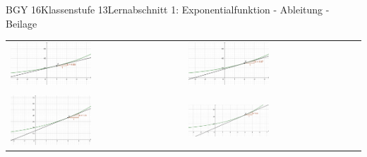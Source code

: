 \documentclass[oneside,openany,headings=optiontotoc,11pt,numbers=noenddot]{scrreprt}
\begin{document}
\begin{worksheet}{BGY 16}{Klassenstufe 13}{Lernabschnitt 1: Exponentialfunktion - Ableitung - Beilage}
\begin{framed}
\begin{tabularx}{\textwidth}{X|X}
				\includegraphics[width=0.48\textwidth]{../99_Bilder/01_ExpFkt/AbleFkt/1O.png} & \includegraphics[width=0.48\textwidth]{../99_Bilder/01_ExpFkt/AbleFkt/2O.png}\\
				\\
				\includegraphics[width=0.48\textwidth]{../99_Bilder/01_ExpFkt/AbleFkt/3O.png} & \includegraphics[width=0.48\textwidth]{../99_Bilder/01_ExpFkt/AbleFkt/4O.png}\\
			\end{tabularx}
		\end{framed}
	\end{worksheet}
\end{document}
